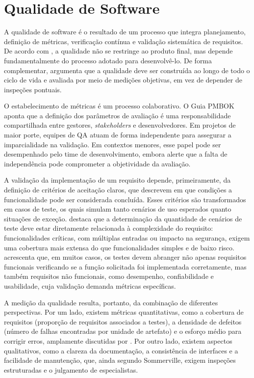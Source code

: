 \section{Qualidade de Software}

A qualidade de software é o resultado de um processo que integra planejamento, definição de métricas, verificação contínua e validação sistemática de requisitos. De acordo com , a qualidade não se restringe ao produto final, mas depende fundamentalmente do processo adotado para desenvolvê-lo. De forma complementar,  argumenta que a qualidade deve ser construída ao longo de todo o ciclo de vida e avaliada por meio de medições objetivas, em vez de depender de inspeções pontuais.


O estabelecimento de métricas é um processo colaborativo. O Guia PMBOK \textit{\cite{pmi2008}} aponta que a definição dos parâmetros de avaliação é uma responsabilidade compartilhada entre gestores, \textit{stakeholders} e desenvolvedores. Em projetos de maior porte, equipes de QA atuam de forma independente para assegurar a imparcialidade na validação. Em contextos menores, esse papel pode ser desempenhado pelo time de desenvolvimento,  embora  alerte que a falta de independência pode comprometer a objetividade da avaliação.

A validação da implementação de um requisito depende, primeiramente, da definição de critérios de aceitação claros, que descrevem em que condições a funcionalidade pode ser considerada concluída. Esses critérios são transformados em casos de teste, os quais simulam tanto cenários de uso esperados quanto situações de exceção. destaca que a determinação da quantidade de cenários de teste deve estar diretamente relacionada à complexidade do requisito: funcionalidades críticas, com múltiplas entradas ou impacto na segurança, exigem uma cobertura mais extensa do que funcionalidades simples e de baixo risco.  acrescenta que, em muitos casos, os testes devem abranger não apenas requisitos funcionais verificando se a função solicitada foi implementada corretamente, mas também requisitos não funcionais, como desempenho, confiabilidade e usabilidade, cuja validação demanda métricas específicas.

A medição da qualidade resulta, portanto, da combinação de diferentes perspectivas. Por um lado, existem métricas quantitativas, como a cobertura de requisitos (proporção de requisitos associados a testes), a densidade de defeitos (número de falhas encontradas por unidade de artefato) e o esforço médio para corrigir erros, amplamente discutidas por . Por outro lado, existem aspectos qualitativos, como a clareza da documentação, a consistência de interfaces e a facilidade de manutenção, que, ainda segundo Sommerville, exigem inspeções estruturadas e o julgamento de especialistas.

